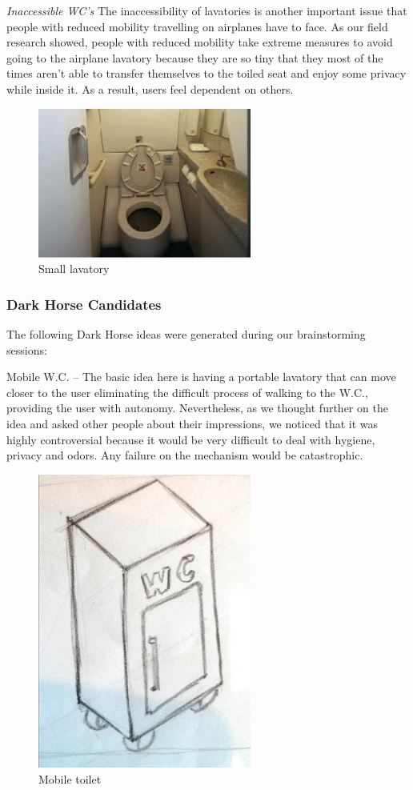 \emph{Inaccessible WC’s} The inaccessibility of lavatories is another important issue that people with reduced mobility travelling on airplanes have to face. As our field research showed, people with reduced mobility take extreme measures to avoid going to the airplane lavatory because they are so tiny that they most of the times aren’t able to transfer themselves to the toiled seat and enjoy some privacy while inside it. As a result, users feel dependent on others.

\begin{figure}[h]
\centering
\includegraphics[width=7cm]{brazil_images/image003.png}
\caption{Small lavatory}
\label{fig:small_lavatory}
\end{figure}

\subsubsection{Dark Horse Candidates}
The following Dark Horse ideas were generated during our brainstorming sessions:

Mobile W.C. – The basic idea here is having a portable lavatory that can move closer to the user eliminating the difficult process of walking to the W.C., providing the user with autonomy. Nevertheless, as we thought further on the idea and asked other people about their impressions, we noticed that it was highly controversial because it would be very difficult to deal with hygiene, privacy and odors. Any failure on the mechanism would be catastrophic.

\begin{figure}[h]
\centering
\includegraphics[width=7cm]{brazil_images/image005.png}
\caption{Mobile toilet}
\label{fig:mobile_toilet}
\end{figure}

